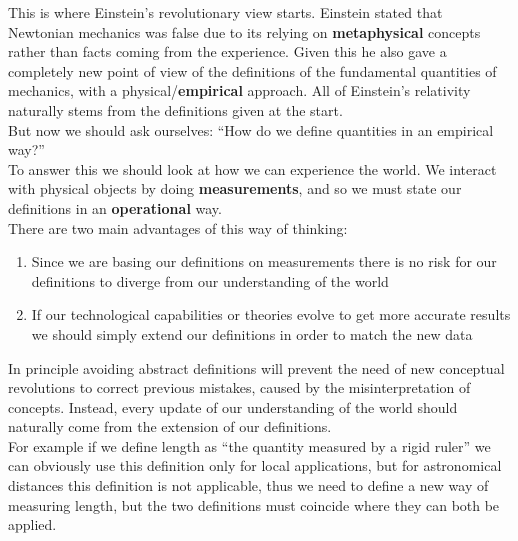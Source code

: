 This is where Einstein's revolutionary view starts. Einstein stated that Newtonian mechanics was false due to its relying on \textbf{metaphysical} concepts rather than facts coming from the experience. Given this he also gave a completely new point of view of the definitions of the fundamental quantities of mechanics, with a physical/\textbf{empirical} approach. All of Einstein's relativity naturally stems from the definitions given at the start.\\
But now we should ask ourselves: ``How do we define quantities in an empirical way?''\\
To answer this we should look at how we can experience the world. We interact with physical objects by doing \textbf{measurements}, and so we must state our definitions in an \textbf{operational} way.\\
There are two main advantages of this way of thinking:
\begin{enumerate}
  \item Since we are basing our definitions on measurements there is no risk for our definitions to diverge from our understanding of the world
  \item If our technological capabilities or theories evolve to get more accurate results we should simply extend our definitions in order to match the new data
\end{enumerate}
In principle avoiding abstract definitions will prevent the need of new conceptual revolutions to correct previous mistakes, caused by the misinterpretation of concepts. Instead, every update of our understanding of the world should naturally come from the extension of our definitions.\\
For example if we define length as ``the quantity measured by a rigid ruler'' we can obviously use this definition only for local applications, but for astronomical distances this definition is not applicable, thus we need to define a new way of measuring length, but the two definitions must coincide where they can both be applied.
